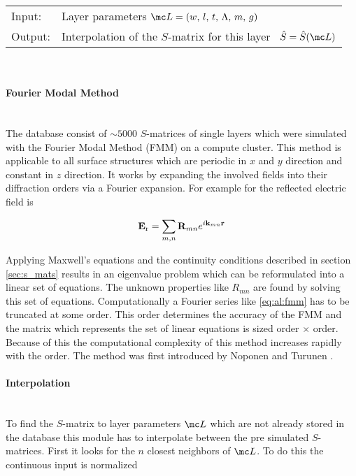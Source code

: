\begin{tabular}{ll}
    \toprule
    Input: & Layer parameters 
    $\mc L = (w, \, l, \, t, \, \Lambda, \, m, \, g)$\\
    Output: & Interpolation of the $S$-matrix for this layer \
    $\hat{S} = \hat{S}(\mc L)$\\
    \bottomrule
\end{tabular}
\\

\paragraph{Fourier Modal Method} ~\\
\label{sec:FMM}The database consist of $\sim 5000$ $S$-matrices of single layers which were simulated with the Fourier Modal Method (FMM) on a compute cluster. This method is applicable to all surface structures which are periodic in $x$ and $y$ direction and constant in $z$ direction. It works by expanding the involved fields into their diffraction orders via a Fourier expansion. For example for the reflected electric field is

\begin{equation} \label{eq:al:fmm}
    \vb E_{\mathrm{r}} = \sum_{m,n} \vb R_{mn} e^{i \vb k_{mn} \vb r}
\end{equation}

Applying Maxwell's equations and the continuity conditions described in section \ref{sec:s_mats} results in an eigenvalue problem which can be reformulated into a linear set of equations. The unknown properties like $R_{mn}$ are found by solving this set of equations. Computationally a Fourier series like \eqref{eq:al:fmm} has to be truncated at some order. This order determines the accuracy of the FMM and the matrix which represents the set of linear equations is sized order $\times$ order. Because of this the computational complexity of this method increases rapidly with the order. The method was first introduced by Noponen and Turunen \cite{Noponen1994}.

\paragraph{Interpolation} ~\\
To find the $S$-matrix to layer parameters $\mc L$ which are not already stored in the database this module has to interpolate between the pre simulated $S$-matrices. First it looks for the $n$ closest neighbors of $\mc L$. To do this the continuous input is normalized

